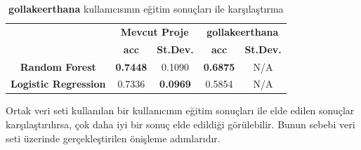 \documentclass[conference]{IEEEtran}
\begin{document}
\begin{table}[h]
	\centering
		\normalsize
\begin{tabular}{|c|cc|cc|}
\hline


\multirow{2}{*}{}          & \multicolumn{2}{c|}{\textbf{Mevcut Proje}}      & \multicolumn{2}{c|}{\textbf{gollakeerthana}}         \\ \cline{2-5} 
                           & \multicolumn{1}{c|}{\textbf{acc}} & \textbf{St.Dev.} & \multicolumn{1}{c|}{\textbf{acc}} & \textbf{St.Dev.} \\ \hline
\textbf{Random Forest}     & \multicolumn{1}{c|}{\textbf{0.7448}}      & 0.1090       & \multicolumn{1}{c|}{\textbf{0.6875}}      & N/A       \\ \hline
\textbf{Logistic Regression} & \multicolumn{1}{c|}{0.7336}      & \textbf{0.0969}       & \multicolumn{1}{c|}{0.5854}      & N/A       \\ \hline
\end{tabular}
\caption{\textbf{gollakeerthana} kullanıcısının eğitim sonuçları\cite{23} ile karşılaştırma}
	\label{tbl:03}
\end{table}

\quad Ortak veri seti kullanılan bir kullanıcının eğitim sonuçları\cite{23} ile elde edilen sonuçlar karşılaştırılırsa, çok daha iyi bir sonuç elde edildiği görülebilir. Bunun sebebi veri seti üzerinde gerçekleştirilen önişleme adımlarıdır.

\end{document}
